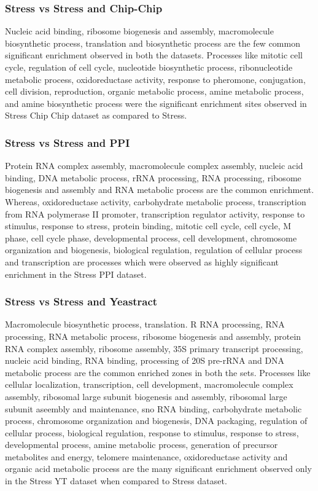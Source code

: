\subsubsection{Stress vs Stress and Chip-Chip}
Nucleic acid binding, ribosome biogenesis  and assembly, macromolecule biosynthetic process, translation and biosynthetic process are the 
few common significant enrichment observed in both the datasets. Processes like mitotic cell cycle, regulation of cell cycle, nucleotide biosynthetic process, 
ribonucleotide metabolic process, oxidoreductase activity, response to pheromone, conjugation, cell division, reproduction, organic metabolic process, 
amine metabolic process, and amine biosynthetic process were the significant enrichment sites observed in Stress Chip Chip dataset as compared to Stress.

\subsubsection{Stress vs Stress and PPI}
Protein RNA complex assembly, macromolecule complex assembly, nucleic acid binding, DNA metabolic process, rRNA processing, RNA processing, 
ribosome biogenesis and assembly and RNA metabolic process are the common enrichment. Whereas, oxidoreductase activity, carbohydrate metabolic process, 
transcription from RNA polymerase II promoter, transcription regulator activity, response to stimulus, response to stress, protein binding, mitotic cell 
cycle, cell cycle, M phase, cell cycle phase, developmental process, cell development, chromosome organization and biogenesis, biological regulation, 
regulation of cellular process and transcription are processes which were observed as highly significant enrichment in the Stress PPI dataset.

\subsubsection{Stress vs Stress and Yeastract}
Macromolecule biosynthetic process, translation. R RNA processing, RNA processing, RNA metabolic process, ribosome biogenesis and assembly, 
protein RNA complex assembly, ribosome  assembly, 35S primary transcript processing, nucleic acid binding, RNA binding, processing of 20S pre-rRNA and 
DNA metabolic process are the common enriched zones in both the sets. Processes like cellular localization, transcription, cell development, macromolecule complex 
assembly, ribosomal large subunit biogenesis and assembly, ribosomal large subunit aseembly and maintenance, sno RNA binding, carbohydrate 
metabolic process, chromosome organization and biogenesis, DNA packaging, regulation of cellular process, biological regulation, response to stimulus, 
response to stress, developmental process, amine metabolic process, generation of precursor metabolites and energy, telomere maintenance, 
oxidoreductase activity and organic acid metabolic process  are the many significant enrichment observed only in the Stress YT dataset when 
compared to Stress dataset.

